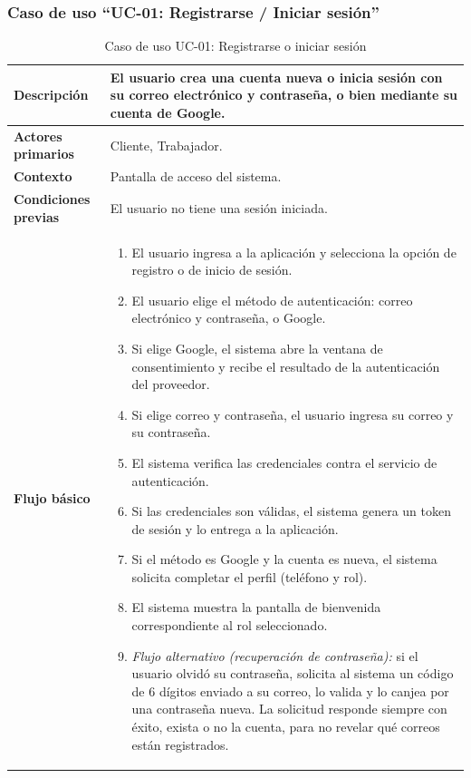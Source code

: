 \documentclass[doc,12pt,a4paper]{apa7}
\begin{document}
\subsubsection{Caso de uso ``UC-01: Registrarse / Iniciar sesión''}

\begin{longtable}{|P{3.3cm}|L{11.2cm}|}
\caption{Caso de uso UC-01: Registrarse o iniciar sesión}\\
\hline
\textbf{Descripción} & El usuario crea una cuenta nueva o inicia sesión con su correo electrónico y contraseña, o bien mediante su cuenta de Google. \\ \hline
\textbf{Actores primarios} & Cliente, Trabajador. \\ \hline
\textbf{Contexto} & Pantalla de acceso del sistema. \\ \hline
\textbf{Condiciones previas} & El usuario no tiene una sesión iniciada. \\ \hline
\textbf{Flujo básico} &
\begin{enumerate}
    \item El usuario ingresa a la aplicación y selecciona la opción de registro o de inicio de sesión.
    \item El usuario elige el método de autenticación: correo electrónico y contraseña, o Google.
    \item Si elige Google, el sistema abre la ventana de consentimiento y recibe el resultado de la autenticación del proveedor.
    \item Si elige correo y contraseña, el usuario ingresa su correo y su contraseña.
    \item El sistema verifica las credenciales contra el servicio de autenticación.
    \item Si las credenciales son válidas, el sistema genera un token de sesión y lo entrega a la aplicación.
    \item Si el método es Google y la cuenta es nueva, el sistema solicita completar el perfil (teléfono y rol).
    \item El sistema muestra la pantalla de bienvenida correspondiente al rol seleccionado.
    \item \textit{Flujo alternativo (recuperación de contraseña):} si el usuario olvidó su contraseña, solicita al sistema un código de 6 dígitos enviado a su correo, lo valida y lo canjea por una contraseña nueva. La solicitud responde siempre con éxito, exista o no la cuenta, para no revelar qué correos están registrados.
\end{enumerate} \\ \hline

\end{longtable}
\end{document}
